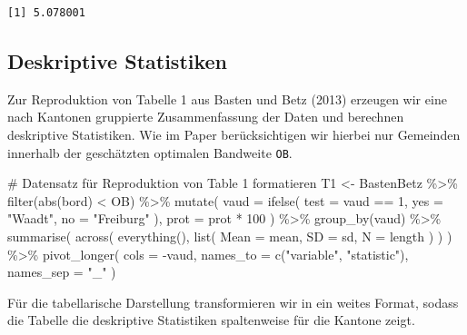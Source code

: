 \documentclass[
  a4paper,
  DIV=11,
  oneside]{scrreprt}
\newenvironment{Shaded}{\begin{snugshade}}{\end{snugshade}}
\newcommand{\AttributeTok}[1]{\textcolor[rgb]{0.40,0.45,0.13}{#1}}
\newcommand{\CommentTok}[1]{\textcolor[rgb]{0.37,0.37,0.37}{#1}}
\newcommand{\DecValTok}[1]{\textcolor[rgb]{0.68,0.00,0.00}{#1}}
\newcommand{\FunctionTok}[1]{\textcolor[rgb]{0.28,0.35,0.67}{#1}}
\newcommand{\NormalTok}[1]{\textcolor[rgb]{0.00,0.23,0.31}{#1}}
\newcommand{\OtherTok}[1]{\textcolor[rgb]{0.00,0.23,0.31}{#1}}
\newcommand{\SpecialCharTok}[1]{\textcolor[rgb]{0.37,0.37,0.37}{#1}}
\newcommand{\StringTok}[1]{\textcolor[rgb]{0.13,0.47,0.30}{#1}}
\begin{document}
\begin{verbatim}
[1] 5.078001
\end{verbatim}

\subsection{Deskriptive Statistiken}\label{deskriptive-statistiken}

Zur Reproduktion von Tabelle 1 aus Basten und Betz (2013) erzeugen wir
eine nach Kantonen gruppierte Zusammenfassung der Daten und berechnen
deskriptive Statistiken. Wie im Paper berücksichtigen wir hierbei nur
Gemeinden innerhalb der geschätzten optimalen Bandweite \texttt{OB}.

\begin{Shaded}
\begin{Highlighting}[]
\CommentTok{\# Datensatz für Reproduktion von Table 1 formatieren}
\NormalTok{T1 }\OtherTok{\textless{}{-}}\NormalTok{ BastenBetz }\SpecialCharTok{\%\textgreater{}\%}
  \FunctionTok{filter}\NormalTok{(}\FunctionTok{abs}\NormalTok{(bord) }\SpecialCharTok{\textless{}}\NormalTok{ OB) }\SpecialCharTok{\%\textgreater{}\%}
  \FunctionTok{mutate}\NormalTok{(}
    \AttributeTok{vaud =} \FunctionTok{ifelse}\NormalTok{(}
      \AttributeTok{test =}\NormalTok{ vaud }\SpecialCharTok{==} \DecValTok{1}\NormalTok{, }
      \AttributeTok{yes =} \StringTok{"Waadt"}\NormalTok{, }
      \AttributeTok{no =} \StringTok{"Freiburg"}
\NormalTok{    ),}
    \AttributeTok{prot =}\NormalTok{ prot }\SpecialCharTok{*} \DecValTok{100}
\NormalTok{  ) }\SpecialCharTok{\%\textgreater{}\%}
  \FunctionTok{group\_by}\NormalTok{(vaud) }\SpecialCharTok{\%\textgreater{}\%}
  \FunctionTok{summarise}\NormalTok{(}
    \FunctionTok{across}\NormalTok{(}
      \FunctionTok{everything}\NormalTok{(), }
      \FunctionTok{list}\NormalTok{(}
        \AttributeTok{Mean =}\NormalTok{ mean, }
        \AttributeTok{SD =}\NormalTok{ sd, }
        \AttributeTok{N =}\NormalTok{ length}
\NormalTok{      )}
\NormalTok{    )}
\NormalTok{  ) }\SpecialCharTok{\%\textgreater{}\%}
  \FunctionTok{pivot\_longer}\NormalTok{(}
    \AttributeTok{cols =} \SpecialCharTok{{-}}\NormalTok{vaud,}
    \AttributeTok{names\_to =} \FunctionTok{c}\NormalTok{(}\StringTok{"variable"}\NormalTok{, }\StringTok{"statistic"}\NormalTok{), }
    \AttributeTok{names\_sep =} \StringTok{"\_"}
\NormalTok{  )}
\end{Highlighting}
\end{Shaded}

Für die tabellarische Darstellung transformieren wir in ein weites
Format, sodass die Tabelle die deskriptive Statistiken spaltenweise für
die Kantone zeigt.
\end{document}
